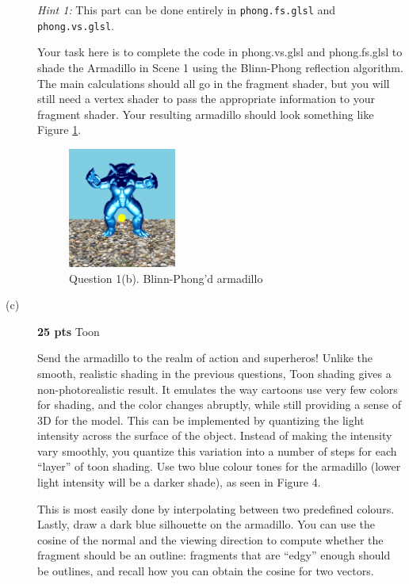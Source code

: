 \documentclass[12pt]{exam}
\begin{document}
\begin{description}
  \textit{Hint 1: }This part can be done entirely in {\tt phong.fs.glsl} and {\tt phong.vs.glsl}. 
    
Your task here is to complete the code in phong.vs.glsl and phong.fs.glsl
to shade the Armadillo in Scene 1 using the Blinn-Phong reflection algorithm. The
main calculations should all go in the fragment shader, but you will still need a
vertex shader to pass the appropriate information to your fragment shader. Your
resulting armadillo should look something like Figure \ref{fig:phong}.

    \begin{figure}[H]
    \centering
    \includegraphics[width=0.35\textwidth]{./q2.png}
    \caption{Question 1(b). Blinn-Phong'd armadillo \label{fig:phong}}
    \end{figure}
    
\clearpage
    
\item [(c)] {\bf 25 pts} Toon
\label{ref:simpleorb}

Send the armadillo to the realm of action and superheros! Unlike the smooth, realistic shading in the previous questions, Toon shading gives a non-photorealistic
result. It emulates the way cartoons use very few colors for shading, and the color
changes abruptly, while still providing a sense of 3D for the model. This can be
implemented by quantizing the light intensity across the surface of the object.
Instead of making the intensity vary smoothly, you quantize this variation into a
number of steps for each “layer” of toon shading.
Use two blue colour tones for the armadillo (lower light intensity will be a darker shade), as seen in Figure 4.

\vspace{0.2cm}

This is most easily done by interpolating between two predefined colours. Lastly,
draw a dark blue silhouette on the armadillo. You can use the cosine of the
normal and the viewing direction to compute whether the fragment should be an
outline: fragments that are “edgy” enough should be outlines, and recall how you
can obtain the cosine for two vectors.


\end{description}
\end{document}
